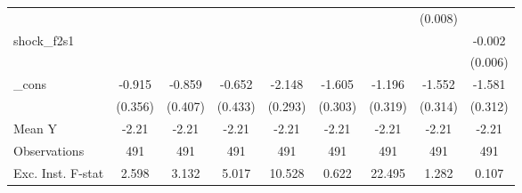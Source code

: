 {\begin{tabular}{l*{8}{c}}
            &                     &                     &                     &                     &                     &                     &     (0.008)         &                     \\
\addlinespace
shock\_f2s1  &                     &                     &                     &                     &                     &                     &                     &      -0.002         \\
            &                     &                     &                     &                     &                     &                     &                     &     (0.006)         \\
\addlinespace
\_cons      &      -0.915\sym{**} &      -0.859\sym{**} &      -0.652         &      -2.148\sym{***}&      -1.605\sym{***}&      -1.196\sym{***}&      -1.552\sym{***}&      -1.581\sym{***}\\
            &     (0.356)         &     (0.407)         &     (0.433)         &     (0.293)         &     (0.303)         &     (0.319)         &     (0.314)         &     (0.312)         \\
\midrule
Mean Y      &       -2.21         &       -2.21         &       -2.21         &       -2.21         &       -2.21         &       -2.21         &       -2.21         &       -2.21         \\
Observations&         491         &         491         &         491         &         491         &         491         &         491         &         491         &         491         \\
Exc. Inst. F-stat&       2.598         &       3.132         &       5.017         &      10.528         &       0.622         &      22.495         &       1.282         &       0.107         \\
\bottomrule
\end{tabular}
}
